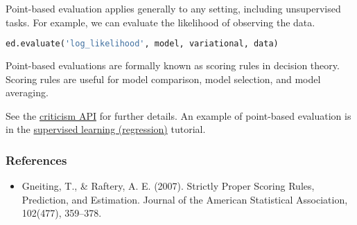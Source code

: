 Point-based evaluation applies generally to any setting, including
unsupervised tasks. For example, we can evaluate the likelihood of
observing the data.
\begin{lstlisting}[language=Python]
ed.evaluate('log_likelihood', model, variational, data)
\end{lstlisting}

Point-based evaluations are formally known as scoring rules
in decision theory. Scoring rules are useful for model comparison, model
selection, and model averaging.

See the \href{api/criticisms.html}{criticism API} for further details.
An example of point-based evaluation is in the
\href{tut_supervised_regression.html}{supervised learning
(regression)} tutorial.

\subsubsection{References}\label{references}

\begin{itemize}
\item
  Gneiting, T., & Raftery, A. E. (2007). Strictly Proper Scoring
  Rules, Prediction, and Estimation. Journal of the American
  Statistical Association, 102(477), 359–378.
\end{itemize}
